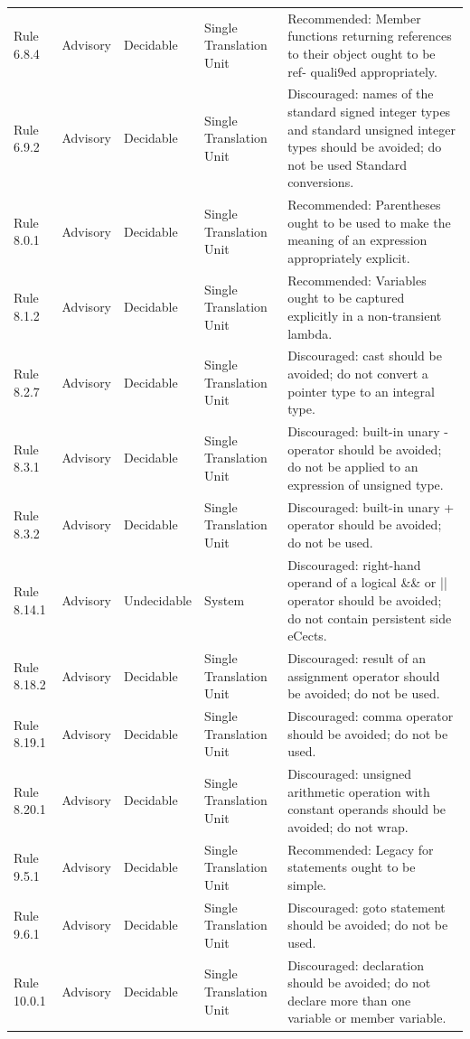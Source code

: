 \documentclass[11pt]{article}
\begin{document}
{\begin{longtable}{@{}P{2.2cm}P{1.7cm}P{2.1cm}P{3.0cm}P{6.7cm}@{}}
Rule 6.8.4 & Advisory & Decidable & Single Translation Unit & Recommended: Member functions returning references to their object ought to be ref- quali9ed appropriately. \\
Rule 6.9.2 & Advisory & Decidable & Single Translation Unit & Discouraged: names of the standard signed integer types and standard unsigned integer types should be avoided; do not be used Standard conversions. \\
Rule 8.0.1 & Advisory & Decidable & Single Translation Unit & Recommended: Parentheses ought to be used to make the meaning of an expression appropriately explicit. \\
Rule 8.1.2 & Advisory & Decidable & Single Translation Unit & Recommended: Variables ought to be captured explicitly in a non-transient lambda. \\
Rule 8.2.7 & Advisory & Decidable & Single Translation Unit & Discouraged: cast should be avoided; do not convert a pointer type to an integral type. \\
Rule 8.3.1 & Advisory & Decidable & Single Translation Unit & Discouraged: built-in unary - operator should be avoided; do not be applied to an expression of unsigned type. \\
Rule 8.3.2 & Advisory & Decidable & Single Translation Unit & Discouraged: built-in unary + operator should be avoided; do not be used. \\
Rule 8.14.1 & Advisory & Undecidable & System & Discouraged: right-hand operand of a logical \&\& or || operator should be avoided; do not contain persistent side eCects. \\
Rule 8.18.2 & Advisory & Decidable & Single Translation Unit & Discouraged: result of an assignment operator should be avoided; do not be used. \\
Rule 8.19.1 & Advisory & Decidable & Single Translation Unit & Discouraged: comma operator should be avoided; do not be used. \\
Rule 8.20.1 & Advisory & Decidable & Single Translation Unit & Discouraged: unsigned arithmetic operation with constant operands should be avoided; do not wrap. \\
Rule 9.5.1 & Advisory & Decidable & Single Translation Unit & Recommended: Legacy for statements ought to be simple. \\
Rule 9.6.1 & Advisory & Decidable & Single Translation Unit & Discouraged: goto statement should be avoided; do not be used. \\
Rule 10.0.1 & Advisory & Decidable & Single Translation Unit & Discouraged: declaration should be avoided; do not declare more than one variable or member variable. \\

\end{longtable}}
\end{document}
